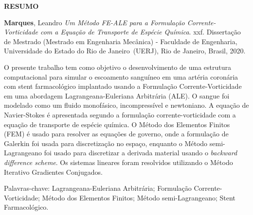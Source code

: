 \begin{center}
\textbf{RESUMO}
\end{center}


$\!$\\

\hspace{-1.3cm}\textbf{Marques}, Leandro \textit{Um Método FE-ALE para a Formulação Corrente-Vorticidade com a Equação de Transporte de Espécie Química}. xxf. Dissertação de Mestrado (Mestrado em Engenharia Mecânica) - Faculdade de Engenharia, Universidade do Estado do Rio de Janeiro~(UERJ), Rio de Janeiro, Brasil, 2020.

\vspace{.2cm}

\indent O presente trabalho tem como objetivo o desenvolvimento de uma estrutura computacional para simular o escoamento sanguíneo em uma artéria coronária com stent farmacológico implantado usando a Formulação Corrente-Vorticidade em uma abordagem Lagrangeana-Euleriana Arbitrária (ALE).
O sangue foi modelado como um fluido monofásico, incompressível e newtoniano.
A equação de Navier-Stokes é apresentada segundo a formulação corrente-vorticidade com a equação de transporte de espécie química.
O Método dos Elementos Finitos (FEM) é usado para resolver as equações de governo, onde a formulação de Galerkin foi usada para discretização no espaço, enquanto o Método semi-Lagrangeano foi usado para discretizar a derivada material usando o \textit{backward difference scheme}. 
Os sistemas lineares foram resolvidos utilizando o Método Iterativo Gradientes Conjugados.

\vspace{1cm}

\hspace{-1.3cm}Palavras-chave: Lagrangeana-Euleriana Arbitrária; Formulação Corrente-Vorticidade; Método dos Elementos Finitos; Método semi-Lagrangeano; Stent Farmacológico.
